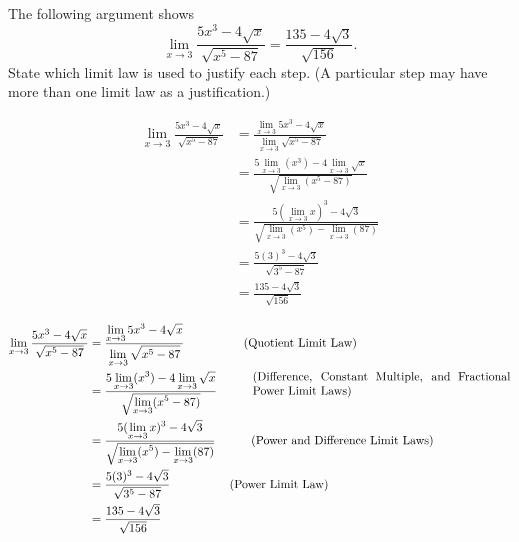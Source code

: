 \documentclass[nooutcomes]{ximera}
\begin{document}
\begin{problem}

  The following argument shows 
  \[
    \lim_{x \to 3} \frac{5x^3 - 4 \sqrt{x}}{\sqrt{x^5 - 87}} = \frac{135 - 4\sqrt{3}}{\sqrt{156}}.
  \]
  State which limit law is used to justify each step.
  (A particular step may have more than one limit law as a justification.)

  \begin{align*}
    \lim_{x \to 3} \frac{5x^3 - 4 \sqrt{x}}{\sqrt{x^5 - 87}}
    &= \frac{\lim_{x \to 3} 5x^3 - 4 \sqrt{x}}{\lim_{x \to 3}\sqrt{x^5 - 87}}\\
    &= \frac{5\lim_{x \to 3}(x^3) - 4 \lim_{x \to 3}\sqrt{x}}{\sqrt{\lim_{x \to 3}(x^5 - 87)}}\\
    &= \frac{5(\lim_{x \to 3}x)^3 - 4 \sqrt{3}}{\sqrt{\lim_{x \to 3}(x^5) - \lim_{x \to 3} (87)}}\\
    &= \frac{5(3)^3 - 4 \sqrt{3}}{\sqrt{3^5 - 87}}\\
    &= \frac{135 - 4\sqrt{3}}{\sqrt{156}}
  \end{align*}
  \begin{freeResponse}
    \begin{align*}
      \lim_{x \to 3} \frac{5x^3 - 4 \sqrt{x}}{\sqrt{x^5 - 87}}
      &= \frac{\lim_{x \to 3} 5x^3 - 4 \sqrt{x}}{\lim_{x \to 3}\sqrt{x^5 - 87}} \hspace*{5em}\parbox[b][]{3in}{(Quotient Limit Law)} \\
      &= \frac{5\lim_{x \to 3}(x^3) - 4 \lim_{x \to 3}\sqrt{x}}{\sqrt{\lim_{x \to 3}(x^5 - 87)}} \hspace*{3em}\parbox[b][]{3in}{(Difference, Constant Multiple, and Fractional Power Limit Laws)}\\
      &= \frac{5(\lim_{x \to 3}x)^3 - 4 \sqrt{3}}{\sqrt{\lim_{x \to 3}(x^5) - \lim_{x \to 3} (87)}} \hspace*{3em}\parbox[b][]{3in}{(Power and Difference Limit Laws)}\\
      &= \frac{5(3)^3 - 4 \sqrt{3}}{\sqrt{3^5 - 87}} \hspace*{5em}\parbox[b][]{3in}{(Power Limit Law)}\\
      &= \frac{135 - 4\sqrt{3}}{\sqrt{156}}
    \end{align*}
  \end{freeResponse}



\end{problem}
\end{document}
